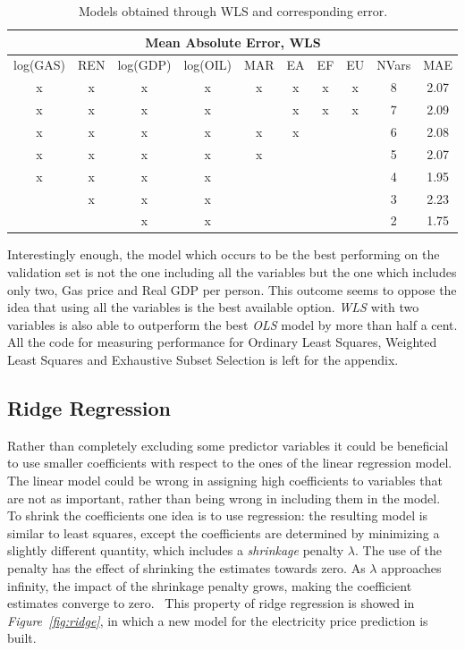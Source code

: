 \documentclass[a4paper,12pt]{book}
\begin{document}
\begin{table}[tb]
\begin{center}
\begin{tabular}{|c|c|c|c|c|c|c|c|c|c|}
\hline
\multicolumn{10}{|c|}{Mean Absolute Error, WLS}\\
\hline
log(GAS)&REN&log(GDP)&log(OIL)&MAR&EA&EF&EU&NVars&MAE\\
\hline
x&x&x&x&x&x&x&x&8&2.07\\
x&x&x&x&&x&x&x&7&2.09\\
x&x&x&x&x&x&&&6&2.08\\
x&x&x&x&x&&&&5&2.07\\
x&x&x&x&&&&&4&1.95\\
&x&x&x&&&&&3&2.23\\
&&x&x&&&&&2&1.75\\
\hline
\end{tabular}
\caption{Models obtained through WLS and corresponding error.}
\label{Tab:mwls}
\end{center}
\end{table}

Interestingly enough, the model which occurs to be the best performing on the validation set is not the one including all the variables but the one which includes only two, Gas price and Real GDP per person. This outcome seems to oppose the idea that using all the variables is the best available option. \textit{WLS} with two variables is also able to outperform the best \textit{OLS} model by more than half a cent. All the code for measuring performance for Ordinary Least Squares, Weighted Least Squares and Exhaustive Subset Selection is left for the appendix.

\subsection{Ridge Regression}

Rather than completely excluding some predictor variables it could be beneficial to use smaller coefficients with respect to the ones of the linear regression model. The linear model could be wrong in assigning high coefficients to variables that are not as important, rather than being wrong in including them in the model. To shrink the coefficients one idea is to use  regression: the resulting model is similar to least squares, except the coefficients are determined by minimizing a slightly different quantity, which includes a \textit{shrinkage} penalty $\lambda$. The use of the penalty has the effect of shrinking the estimates towards zero. As $\lambda$ approaches infinity, the impact of the shrinkage penalty grows, making the coefficient estimates converge to zero.~\cite{james2013introduction} This property of ridge regression is showed in \textit{Figure~\ref{fig:ridge}}, in which a new model for the electricity price prediction is built.
\end{document}
